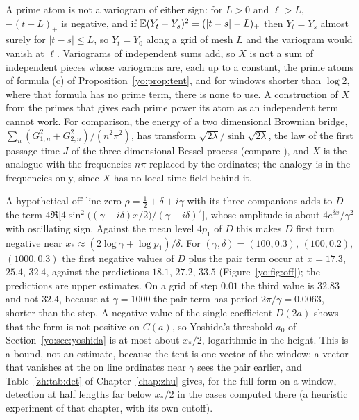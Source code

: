 A prime atom is not a variogram of either sign: for $L>0$ and $\ell>L$, $-(t-L)_+$ is negative, and if $\mathbb{E}(Y_t-Y_s)^2=(|t-s|-L)_+$ then $Y_t=Y_s$ almost surely for $|t-s|\le L$, so $Y_t=Y_0$ along a grid of mesh $L$ and the variogram would vanish at $\ell$. Variograms of independent sums add, so $X$ is not a sum of independent pieces whose variograms are, each up to a constant, the prime atoms of formula (c) of Proposition~\ref{yo:prop:tent}, and for windows shorter than $\log2$, where that formula has no prime term, there is none to use. A construction of $X$ from the primes that gives each prime power its atom as an independent term cannot work. For comparison, the energy of a two dimensional Brownian bridge, $\sum_n(G_{1,n}^2+G_{2,n}^2)/(n^2\pi^2)$, has transform $\sqrt{2\lambda}/\sinh\sqrt{2\lambda}$, the law of the first passage time $J$ of the three dimensional Bessel process (compare \cite{Williams90}), and $X$ is the analogue with the frequencies $n\pi$ replaced by the ordinates; the analogy is in the frequencies only, since $X$ has no local time field behind it.

\begin{remark}\label{yo:rem:scale}
A hypothetical off line zero $\rho=\frac12+\delta+i\gamma$ with its three companions adds to $D$ the term $4\Re\bigl[4\sin^2\bigl((\gamma-i\delta)x/2\bigr)/(\gamma-i\delta)^2\bigr]$, whose amplitude is about $4e^{\delta x}/\gamma^2$ with oscillating sign. Against the mean level $4p_1$ of $D$ this makes $D$ first turn negative near $x_*\approx(2\log\gamma+\log p_1)/\delta$. For $(\gamma,\delta)=(100,0.3)$, $(100,0.2)$, $(1000,0.3)$ the first negative values of $D$ plus the pair term occur at $x=17.3$, $25.4$, $32.4$, against the predictions $18.1$, $27.2$, $33.5$ (Figure~\ref{yo:fig:off}); the predictions are upper estimates. On a grid of step $0.01$ the third value is $32.83$ and not $32.4$, because at $\gamma=1000$ the pair term has period $2\pi/\gamma=0.0063$, shorter than the step. A negative value of the single coefficient $D(2a)$ shows that the form is not positive on $C(a)$, so Yoshida's threshold $a_0$ of Section~\ref{yo:sec:yoshida} is at most about $x_*/2$, logarithmic in the height. This is a bound, not an estimate, because the tent is one vector of the window: a vector that vanishes at the on line ordinates near $\gamma$ sees the pair earlier, and Table~\ref{zh:tab:det} of Chapter~\ref{chap:zhu} gives, for the full form on a window, detection at half lengths far below $x_*/2$ in the cases computed there (a heuristic experiment of that chapter, with its own cutoff).
\end{remark}

